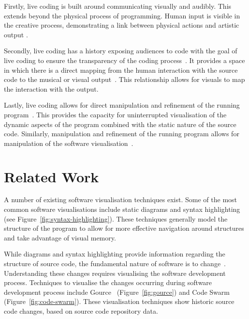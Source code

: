 Firstly, live coding is built around communicating visually and audibly. This extends beyond the physical process of programming. Human input is visible in the creative process, demonstrating a link between physical actions and artistic output \cite{Mclean}.

Secondly, live coding has a history exposing audiences to code with the goal of live coding to ensure the transparency of the coding process~\cite{Collins2011,McLean2010a}. It provides a space in which there is a direct mapping from the human interaction with the source code to the musical or visual output~\cite{Mclean}. This relationship allows for visuals to map the interaction with the output.

Lastly, live coding allows for direct manipulation and refinement of the running program~\cite{Swift2013}. This provides the capacity for uninterrupted visualisation of the dynamic aspects of the program combined with the static nature of the source code. Similarly, manipulation and refinement of the running program allows for manipulation of the software visualisation~\cite{McLean2010a}.





\section{Related Work}

A number of existing software visualisation techniques exist. Some of the most common software visualisations include static diagrams and syntax highlighting (see Figure~\ref{fig:syntax-highlighting}). These techniques generally model the structure of the program to allow for more effective navigation around structures and take advantage of visual memory.

While diagrams and syntax highlighting provide information regarding the structure of source code, the fundamental nature of software is to change~\cite{Brooks1995}. Understanding these changes requires visualising the software development process. Techniques to visualise the changes occurring during software development process include Gource~\cite{Caudwell2010} (Figure~\ref{fig:gource}) and Code Swarm~\cite{Ogawa2012} (Figure~\ref{fig:code-swarm}). These visualisation techniques show historic source code changes, based on source code repository data.

